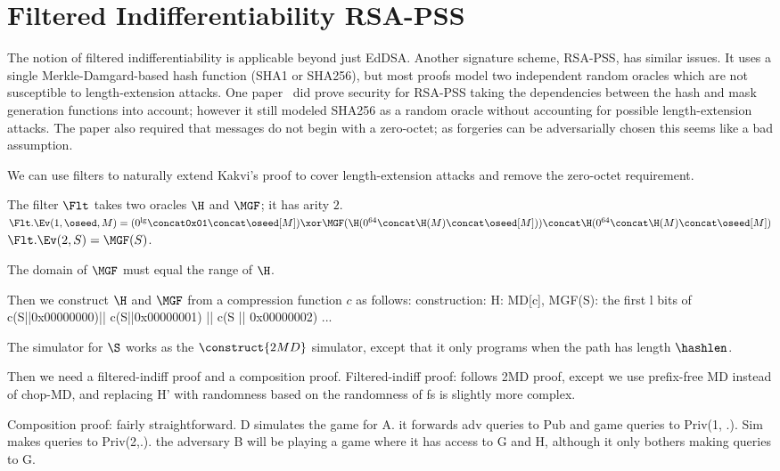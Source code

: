 \section{Filtered Indifferentiability RSA-PSS}
The notion of filtered indifferentiability is applicable beyond just EdDSA.
Another signature scheme, RSA-PSS, has similar issues. 
It uses a single Merkle-Damgard-based hash function (SHA1 or SHA256), but most proofs model two independent random oracles which are not susceptible to length-extension attacks.
One paper~\cite{SSR:Kakvi19} did prove security for RSA-PSS taking the dependencies between the hash and mask generation functions into account; however it still modeled SHA256 as a random oracle without accounting for possible length-extension attacks.
The paper also required that messages do not begin with a zero-octet; as forgeries can be adversarially chosen this seems like a bad assumption.

We can use filters to naturally extend Kakvi's proof to cover length-extension attacks and remove the zero-octet requirement.

The filter $\Flt$ takes two oracles $\H$ and $\MGF$; it has arity $2$.
$\Flt.\Ev(1, \oseed, M) = (0^{\lg} \concat \texttt{0x01} \concat \oseed[M]) \xor \MGF(\H(0^{64} \concat \H(M) \concat \oseed[M]))  \concat \H(0^{64} \concat \H(M) \concat \oseed[M])$
$\Flt.\Ev(2, S) = \MGF(S)$.

The domain of $\MGF$ must equal the range of $\H$.

Then we construct $\H$ and $\MGF$ from a compression function $c$ as follows:
construction: H: MD[c], MGF(S): the first l bits of c(S||0x00000000)|| c(S||0x00000001) || c(S || 0x00000002) ...

The simulator for $\S$ works as the $\construct{2MD}$ simulator, except that it only programs when the path has length $\hashlen$. 

Then we need a filtered-indiff proof and a composition proof.
Filtered-indiff proof:
	follows 2MD proof, except we use prefix-free MD instead of chop-MD, and replacing H' with randomness based on the randomness of fs is slightly more complex.
	
Composition proof:
	fairly straightforward. D simulates the game for A. it forwards adv queries to Pub and game queries to Priv(1, .). Sim makes queries to Priv(2,.). the adversary B will be playing a game where it has access to G and H, although it only bothers making queries to G. 
	
